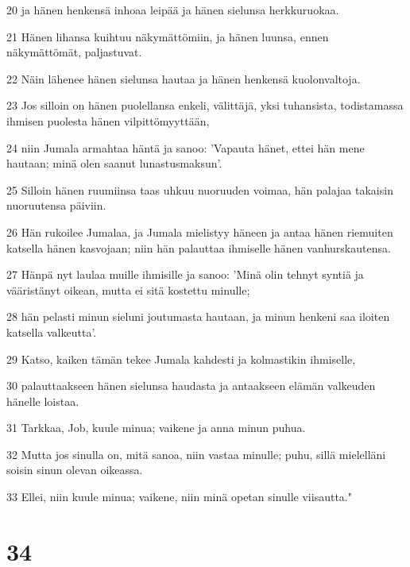 \par 20 ja hänen henkensä inhoaa leipää ja hänen sielunsa herkkuruokaa.
\par 21 Hänen lihansa kuihtuu näkymättömiin, ja hänen luunsa, ennen näkymättömät, paljastuvat.
\par 22 Näin lähenee hänen sielunsa hautaa ja hänen henkensä kuolonvaltoja.
\par 23 Jos silloin on hänen puolellansa enkeli, välittäjä, yksi tuhansista, todistamassa ihmisen puolesta hänen vilpittömyyttään,
\par 24 niin Jumala armahtaa häntä ja sanoo: 'Vapauta hänet, ettei hän mene hautaan; minä olen saanut lunastusmaksun'.
\par 25 Silloin hänen ruumiinsa taas uhkuu nuoruuden voimaa, hän palajaa takaisin nuoruutensa päiviin.
\par 26 Hän rukoilee Jumalaa, ja Jumala mielistyy häneen ja antaa hänen riemuiten katsella hänen kasvojaan; niin hän palauttaa ihmiselle hänen vanhurskautensa.
\par 27 Hänpä nyt laulaa muille ihmisille ja sanoo: 'Minä olin tehnyt syntiä ja vääristänyt oikean, mutta ei sitä kostettu minulle;
\par 28 hän pelasti minun sieluni joutumasta hautaan, ja minun henkeni saa iloiten katsella valkeutta'.
\par 29 Katso, kaiken tämän tekee Jumala kahdesti ja kolmastikin ihmiselle,
\par 30 palauttaakseen hänen sielunsa haudasta ja antaakseen elämän valkeuden hänelle loistaa.
\par 31 Tarkkaa, Job, kuule minua; vaikene ja anna minun puhua.
\par 32 Mutta jos sinulla on, mitä sanoa, niin vastaa minulle; puhu, sillä mielelläni soisin sinun olevan oikeassa.
\par 33 Ellei, niin kuule minua; vaikene, niin minä opetan sinulle viisautta."

\chapter{34}

